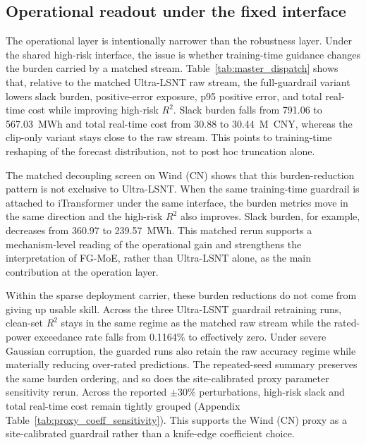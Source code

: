 \documentclass[review,1p,times]{elsarticle}
\begin{document}
\subsection{Operational readout under the fixed interface}
\label{subsec:results_dispatch}
The operational layer is intentionally narrower than the robustness layer. Under the shared high-risk interface, the issue is whether training-time guidance changes the burden carried by a matched stream. Table~\ref{tab:master_dispatch} shows that, relative to the matched Ultra-LSNT raw stream, the full-guardrail variant lowers slack burden, positive-error exposure, p95 positive error, and total real-time cost while improving high-risk $R^2$. Slack burden falls from 791.06 to 567.03~MWh and total real-time cost from 30.88 to 30.44~M~CNY, whereas the clip-only variant stays close to the raw stream. This points to training-time reshaping of the forecast distribution, not to post hoc truncation alone.

The matched decoupling screen on Wind (CN) shows that this burden-reduction pattern is not exclusive to Ultra-LSNT. When the same training-time guardrail is attached to iTransformer under the same interface, the burden metrics move in the same direction and the high-risk $R^2$ also improves. Slack burden, for example, decreases from 360.97 to 239.57~MWh. This matched rerun supports a mechanism-level reading of the operational gain and strengthens the interpretation of FG-MoE, rather than Ultra-LSNT alone, as the main contribution at the operation layer.

Within the sparse deployment carrier, these burden reductions do not come from giving up usable skill. Across the three Ultra-LSNT guardrail retraining runs, clean-set $R^2$ stays in the same regime as the matched raw stream while the rated-power exceedance rate falls from 0.1164\% to effectively zero. Under severe Gaussian corruption, the guarded runs also retain the raw accuracy regime while materially reducing over-rated predictions. The repeated-seed summary preserves the same burden ordering, and so does the site-calibrated proxy parameter sensitivity rerun. Across the reported $\pm 30\%$ perturbations, high-risk slack and total real-time cost remain tightly grouped (Appendix Table~\ref{tab:proxy_coeff_sensitivity}). This supports the Wind (CN) proxy as a site-calibrated guardrail rather than a knife-edge coefficient choice.
\end{document}
